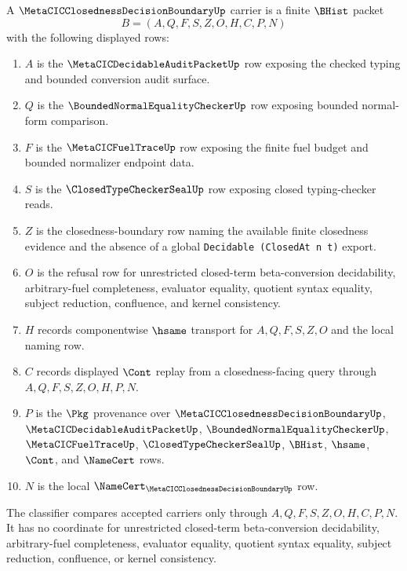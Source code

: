 \begin{definition}
\label{def:metacic-closedness-decision-boundary-carrier}
A $\MetaCICClosednessDecisionBoundaryUp$ carrier is a finite $\BHist$ packet
$$
B=(A,Q,F,S,Z,O,H,C,P,N)
$$
with the following displayed rows:
\begin{enumerate}
\item $A$ is the $\MetaCICDecidableAuditPacketUp$ row exposing the checked typing and bounded conversion audit surface.
\item $Q$ is the $\BoundedNormalEqualityCheckerUp$ row exposing bounded normal-form comparison.
\item $F$ is the $\MetaCICFuelTraceUp$ row exposing the finite fuel budget and bounded normalizer endpoint data.
\item $S$ is the $\ClosedTypeCheckerSealUp$ row exposing closed typing-checker reads.
\item $Z$ is the closedness-boundary row naming the available finite closedness evidence and the absence of a global \texttt{Decidable (ClosedAt n t)} export.
\item $O$ is the refusal row for unrestricted closed-term beta-conversion decidability, arbitrary-fuel completeness, evaluator equality, quotient syntax equality, subject reduction, confluence, and kernel consistency.
\item $H$ records componentwise $\hsame$ transport for $A,Q,F,S,Z,O$ and the local naming row.
\item $C$ records displayed $\Cont$ replay from a closedness-facing query through $A,Q,F,S,Z,O,H,P,N$.
\item $P$ is the $\Pkg$ provenance over $\MetaCICClosednessDecisionBoundaryUp$, $\MetaCICDecidableAuditPacketUp$, $\BoundedNormalEqualityCheckerUp$, $\MetaCICFuelTraceUp$, $\ClosedTypeCheckerSealUp$, $\BHist$, $\hsame$, $\Cont$, and $\NameCert$ rows.
\item $N$ is the local $\NameCert_{\MetaCICClosednessDecisionBoundaryUp}$ row.
\end{enumerate}
The classifier compares accepted carriers only through $A,Q,F,S,Z,O,H,C,P,N$. It has no coordinate for unrestricted closed-term beta-conversion decidability, arbitrary-fuel completeness, evaluator equality, quotient syntax equality, subject reduction, confluence, or kernel consistency.
\end{definition}

